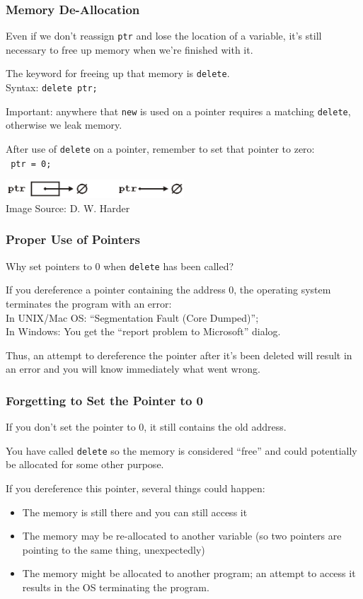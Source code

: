 \begin{frame}
\frametitle{Memory De-Allocation}

Even if we don't reassign \texttt{ptr} and lose the location of a variable, it's still necessary to free up memory when we're finished with it.

The keyword for freeing up that memory is \texttt{delete}.\\
\quad Syntax: \texttt{delete ptr;}

Important: anywhere that \texttt{new} is used on a pointer requires a matching \texttt{delete}, otherwise we leak memory.

After use of \texttt{delete} on a pointer, remember to set that pointer to zero:\\
\quad \texttt{ ptr = 0; }

\begin{center}
\includegraphics[width=0.5\textwidth]{images/ptr03.png}\\
{\tiny Image Source: D. W. Harder}
\end{center}


\end{frame}

\begin{frame}
\frametitle{Proper Use of Pointers}
Why set pointers to 0 when \texttt{delete} has been called?

If you dereference a pointer containing the address 0, the operating system terminates the program with an error:\\
\quad In UNIX/Mac OS: ``Segmentation Fault (Core Dumped)'';\\
\quad In Windows: You get the ``report problem to Microsoft'' dialog.

Thus, an attempt to dereference the pointer after it's been deleted will result in an error and you will know immediately what went wrong.



\end{frame}

\begin{frame}
\frametitle{Forgetting to Set the Pointer to 0}
If you don't set the pointer to 0, it still contains the old address.

You have called \texttt{delete} so the memory is considered ``free'' and could potentially be allocated for some other purpose.

If you dereference this pointer, several things could happen:
\begin{itemize}
	\item The memory is still there and you can still access it
	\item The memory may be re-allocated to another variable (so two pointers are pointing to the same thing, unexpectedly)
	\item The memory might be allocated to another program; an attempt to access it results in the OS terminating the program.
\end{itemize}

\end{frame}


